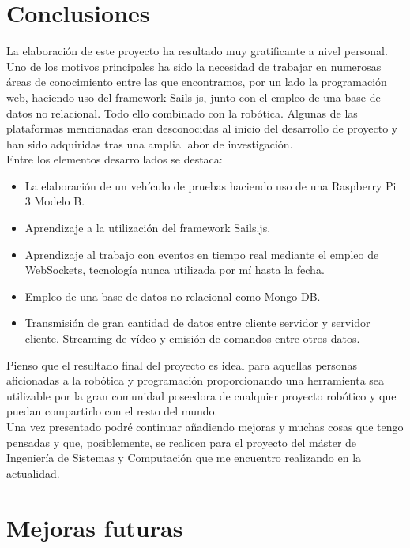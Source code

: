 \section{Conclusiones}

La elaboración de este proyecto ha resultado muy gratificante a nivel personal. Uno de los motivos principales ha sido la necesidad de trabajar en numerosas áreas de conocimiento entre las que 
encontramos, por un lado la programación web, haciendo uso del framework Sails js, junto con el empleo de una base de datos no relacional. 
Todo ello combinado con la robótica. Algunas de las plataformas mencionadas eran desconocidas al inicio del desarrollo de proyecto y han sido adquiridas tras una amplia labor de investigación.\\

Entre los elementos desarrollados se destaca:

\begin{itemize}
 \item La elaboración de un vehículo de pruebas haciendo uso de una Raspberry Pi 3 Modelo B.
 \item Aprendizaje a la utilización del framework Sails.js.
 \item Aprendizaje al trabajo con eventos en tiempo real mediante el empleo de WebSockets, tecnología nunca utilizada por mí hasta la fecha.
 \item Empleo de una base de datos no relacional como Mongo DB.
 \item Transmisión de gran cantidad de datos entre cliente servidor y servidor cliente. Streaming de vídeo y emisión de comandos entre otros datos.
\end{itemize}


Pienso que el resultado final del proyecto es ideal para aquellas personas aficionadas a la robótica y programación proporcionando una herramienta sea utilizable por la gran comunidad poseedora 
de cualquier proyecto robótico y que puedan compartirlo con el resto del mundo.\\

Una vez presentado podré continuar añadiendo mejoras y muchas cosas que tengo pensadas y que, posiblemente, se realicen para el proyecto del máster de Ingeniería de Sistemas y Computación que me 
encuentro realizando en la actualidad.\\

\section{Mejoras futuras}

